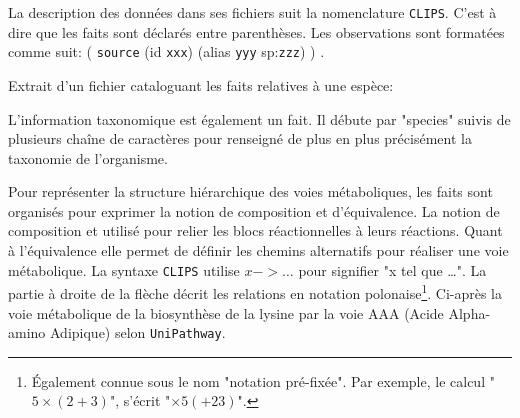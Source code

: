 \begin{refsegment}


La description des données dans ses fichiers suit la nomenclature \texttt{\gls{CLIPS}}. C'est à dire que les faits sont déclarés entre parenthèses. Les observations sont formatées comme suit: ( \texttt{source} (id \texttt{xxx}) (alias \texttt{yyy} sp:\texttt{zzz})  ) .

Extrait d'un fichier cataloguant les faits relatives à une espèce:\nolisttopbreak



L'information taxonomique est également un fait. Il débute par "species" suivis de plusieurs chaîne de caractères pour renseigné de plus en plus précisément la taxonomie de l'organisme.


Pour représenter la structure hiérarchique des voies métaboliques, les faits sont organisés pour exprimer la notion de composition et d'équivalence. La notion de composition et utilisé pour relier les blocs réactionnelles à leurs réactions. Quant à l'équivalence elle permet de définir les chemins alternatifs pour réaliser une voie métabolique. La syntaxe \texttt{\gls{CLIPS}} utilise $x -> \ldots$ pour signifier "x tel que \ldots". La partie à droite de la flèche décrit les relations en notation polonaise\footnote{Également connue sous le nom "notation pré-fixée". Par exemple, le calcul "$5 \times (2 + 3)$", s'écrit "$\times 5 (+ 2 3)$". }. Ci-après la voie métabolique de la biosynthèse de la lysine par la voie AAA (Acide Alpha-amino Adipique) selon \texttt{UniPathway}.


\end{refsegment}
